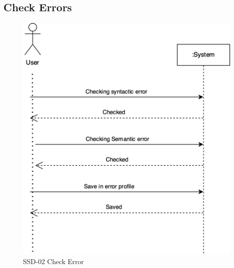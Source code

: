 \documentclass[12pt,a4paper]{article}
\begin{document}
\subsection{Check Errors}
\begin{figure}[h]
 \centering
\includegraphics[scale=0.30]{Diagram/CheckingError_SSD.png}
\caption{SSD-02 Check Error}
\end{figure}
\newpage
\end{document}
